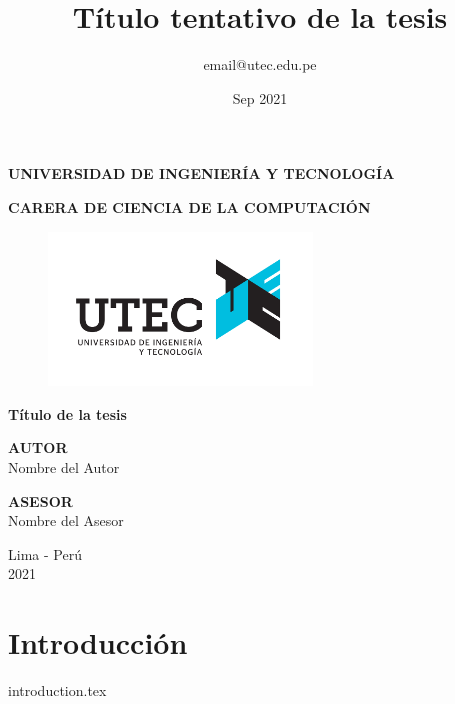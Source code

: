 \documentclass{report}
\title{Título tentativo de la tesis}
\author{email@utec.edu.pe}
\date{Sep 2021}
\begin{document}
\begin{titlepage}
    \begin{center}
        \Large
        \textbf{UNIVERSIDAD DE INGENIERÍA Y TECNOLOGÍA}
        \vspace*{1cm}
        
        \large
        \textbf{CARERA DE CIENCIA DE LA COMPUTACIÓN}
        \vspace*{1cm}
        
        \begin{figure}[htbp]
            \centering
            \includegraphics[width=7cm,height=\textheight,keepaspectratio]{images/LOGO_UTEC}
        \end{figure}

            
        \LARGE
        \textbf{Título de la tesis}
            
        \vspace{1.0cm}
        \Large
        
            
        \textbf{AUTOR}
        \vspace{0.5cm}
        \\Nombre del Autor
        \vfill
        
        \vspace{1.0cm}
        
        \textbf{ASESOR}
        \vspace{0.5cm}
        \\Nombre del Asesor
        \vfill
        \vspace{0.8cm}
        \Large
        
        Lima - Perú
        \\
        2021
            
    \end{center}
\end{titlepage}


\tableofcontents

\chapter{Introducción}
{introduction.tex}
\end{document}
